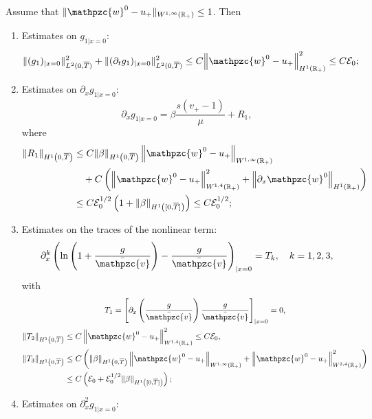 \documentclass[AHL,Unicode,longabstracts,published]{cedram}
\newcommand{\R}{\mathbb{R}}
\newcommand{\p}{\partial}
\newcommand{\bv}{\bar{\mathpzc{v}}}
\newcommand{\cE}{\mathcal E}
\newcommand{\tw}{\mathpzc{w}}
\begin{document}
\begin{lemm}\label{lem:traces}
Assume that $\|\tw^0-u_+\|_{W^{1,\infty}(\R_+)}\leq 1$. Then
\begin{enumerate}
\item\label{lemm6.4.1} Estimates on $g_{1|x=0}$:
\begin{equation}\label{est:bc-g1}
\|(g_1)_{|x=0}\|_{L^2(0,\overline{T})}^2 + \|(\partial_t g_1)_{|x=0}\|_{L^2(0,\overline{T})}^2
\leq C{\left\|\tw^0- u_+\right\|^2_{H^1(\R_+)}}
\leq C \cE_0;
\end{equation}

\item\label{lemm6.4.2} Estimates on $\p_x g_{1|x=0}$:
\begin{equation}\label{g1-R1}
\p_x g_{1|x=0}= \beta \dfrac{s(v_+ - 1)}{\mu} + R_1,
\end{equation}
where
\begin{align*}
\|R_1\|_{H^1\left(0,\overline{T}\right)}&\leq C\|\beta\|_{H^1\left(0,\overline{T}\right)}\left\|\tw^0- u_+\right\|_{W^{1,\infty}(\R_+)} \\
&\quad+ C \left(\left\|\tw^0-u_+\right\|_{W^{1,4}(\R_+)}^2 + \left\|\p_x \tw^0\right\|_{H^1(\R_+)}\right)\\
&\leq C \cE_0^{1/2} \left(1 + \|\beta\|_{H^1\left([0, \overline{T}]\right)}\right) \leq C \cE_0^{1/2};
\end{align*}
\item\label{lemm6.4.3} Estimates on the traces of the nonlinear term:
\[
\p_x^k \left(\ln \left(1+ \frac{g}{\bv}\right) - \frac{g}{\bv} \right)_{|x=0}=T_k, \quad k=1,2,3,
\]
with
\begin{multline}\label{est:traces-NL}
T_1 = \left[\partial_x \left(\dfrac{g}{\bv} \right)\dfrac{g}{\bv}\right]_{|x=0} = 0, \\
\begin{aligned}
\|T_2\|_{H^1\left(0,\overline{T}\right)}&\leq C \left\|\tw^0-u_+\right\|_{W^{1,4}(\R_+)}^2\leq C \cE_0,\\
\|T_3\|_{H^1\left(0,\overline{T}\right)}&\leq C \left(\|\beta\|_{H^1\left(0, \overline{T}\right)}\left\|\tw^0-u_+\right\|_{W^{1,\infty}(\R_+)} + \left\|\tw^0-u_+\right\|_{W^{2,4}(\R_+)}^2\right)\\
&\leq C \left(\cE_0 + \cE_0^{1/2} \|\beta\|_{H^1\left([0, \overline{T}]\right)}\right);
\end{aligned}
\end{multline}
\item\label{lemm6.4.4} Estimates on $\p_x^2 g_{1|x=0}$:
\begin{equation}\label{bc:px2g1}

\end{equation}
\end{enumerate}
\end{lemm}
\end{document}
